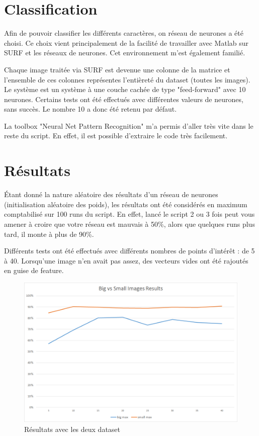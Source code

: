 \section{Classification}

Afin de pouvoir classifier les différents caractères, on réseau de neurones a été choisi. Ce choix vient principalement de la facilité de travailler avec Matlab sur SURF et les réseaux de neurones. Cet environnement m'est également familié.

Chaque image traitée via SURF est devenue une colonne de la matrice et l'ensemble de ces colonnes représentes l'entièreté du dataset (toutes les images). Le système est un système à une couche cachée de type "feed-forward" avec 10 neurones. Certains tests ont été effectués avec différentes valeurs de neurones, sans succès. Le nombre 10 a donc été retenu par défaut.

La toolbox "Neural Net Pattern Recognition" m'a permis d'aller très vite dans le reste du script. En effet, il est possible d'extraire le code très facilement.

\section{Résultats}

Étant donné la nature aléatoire des résultats d'un réseau de neurones (initialisation aléatoire des poids), les résultats ont été considérés en maximum comptabilisé sur 100 runs du script. En effet, lancé le script 2 ou 3 fois peut vous amener à croire que votre réseau est mauvais à 50\%, alors que quelques runs plus tard, il monte à plus de 90\%.

Différents tests ont été effectués avec différents nombres de points d'intérêt : de 5 à 40. Lorsqu'une image n'en avait pas assez, des vecteurs vides ont été rajoutés en guise de feature. 

\begin{figure}[h]
\centering
\includegraphics[width=0.8\linewidth]{pictures/bigvssmallresults.png}
\caption{Résultats avec les deux dataset}
\label{fig:resultdataset}
\end{figure}

